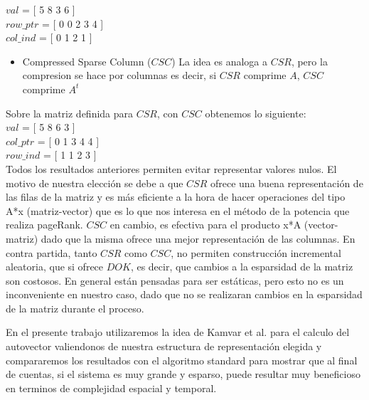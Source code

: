    $val$  = [ 5 8 3 6 ] \\
   $row\_ptr$ = [ 0 0 2 3 4 ] \\
   $col\_ind$ = [ 0 1 2 1 ] \\

\begin{itemize}
\item Compressed Sparse Column ($CSC$)
La idea es analoga a $CSR$, pero la compresion se hace por columnas es decir, si $CSR$ comprime $A$, $CSC$ comprime $A^t$  
\end{itemize}

Sobre la matriz definida para $CSR$, con $CSC$ obtenemos lo siguiente: \\

   $val$  = [ 5 8 6 3 ] \\
   $col\_ptr$ = [ 0 1 3 4 4 ] \\   
   $row\_ind$ = [ 1 1 2 3 ] \\

Todos los resultados anteriores permiten evitar representar valores nulos.	
El motivo de nuestra elección se debe a que $CSR$ ofrece una buena representación de las filas de la matriz y es más eficiente a la hora de hacer operaciones del tipo A*x (matriz-vector) que es lo que nos interesa en el método de la potencia que realiza pageRank. $CSC$ en cambio, es efectiva para el producto x*A (vector-matriz) dado que la misma ofrece una mejor representación de las columnas. En contra partida, tanto $CSR$ como $CSC$, no permiten construcción incremental aleatoria, que si ofrece $DOK$, es decir, que cambios a la esparsidad de la matriz son costosos. En general están pensadas para ser estáticas, pero esto no es un inconveniente en nuestro caso, dado que no se realizaran cambios en la esparsidad de la matriz durante el proceso.

En el presente trabajo utilizaremos la idea de Kamvar et al. \cite[Algoritmo 1]{Kamvar2003} para el calculo del autovector valiendonos de nuestra estructura de representación elegida y compararemos los resultados con el algoritmo standard para mostrar que al final de cuentas, si el sistema es muy grande y esparso, puede resultar muy beneficioso en terminos de complejidad espacial y temporal.